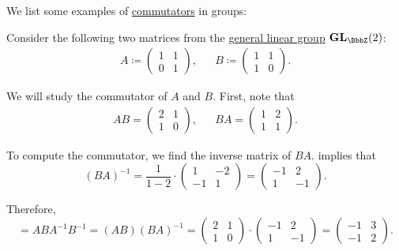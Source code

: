 \begin{example}\label{ex:def:group_commutator}
  We list some examples of \hyperref[def:group_commutator]{commutators} in groups:
  \begin{thmenum}
     Consider the following two matrices from the \hyperref[def:linear_groups]{general linear group} \( \grp{GL}_\BbbZ(2) \):
    \begin{align*}
      A \coloneqq \begin{pmatrix} 1 & 1 \\ 0 & 1 \end{pmatrix},
      &&
      B \coloneqq \begin{pmatrix} 1 & 1 \\ 1 & 0 \end{pmatrix}.
    \end{align*}

    We will study the commutator of \( A \) and \( B \). First, note that
    \begin{align*}
      AB = \begin{pmatrix} 2 & 1 \\ 1 & 0 \end{pmatrix},
      &&
      BA = \begin{pmatrix} 1 & 2 \\ 1 & 1 \end{pmatrix}.
    \end{align*}

    To compute the commutator, we find the inverse matrix of \( BA \).  implies that
    \begin{equation*}
      (BA)^{-1}
      =
      \frac 1 {1 - 2} \cdot \begin{pmatrix} 1 & -2 \\ -1 & 1 \end{pmatrix}
      =
      \begin{pmatrix} -1 & 2 \\ 1 & -1 \end{pmatrix}.
    \end{equation*}

    Therefore,
    \begin{equation*}
      [A, B]
      =
      ABA^{-1}B^{-1}
      =
      (AB) (BA)^{-1}
      =
      \begin{pmatrix} 2 & 1 \\ 1 & 0 \end{pmatrix}
      \cdot
      \begin{pmatrix} -1 & 2 \\ 1 & -1 \end{pmatrix}
      =
      \begin{pmatrix} -1 & 3 \\ -1 & 2 \end{pmatrix}.
    \end{equation*}


\end{thmenum}
\end{example}
